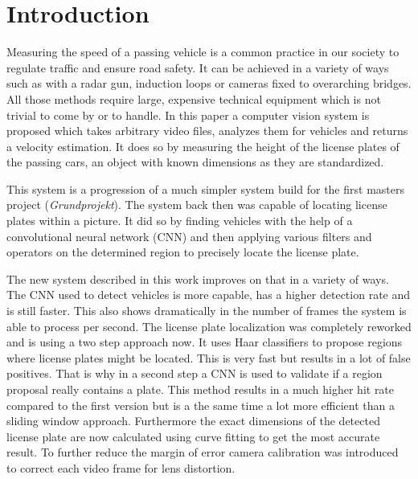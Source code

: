 \chapter{Introduction}\label{ch:introduction}

Measuring the speed of a passing vehicle is a common practice in our society to regulate traffic and ensure road safety.
It can be achieved in a variety of ways such as with a radar gun, induction loops or cameras fixed to overarching bridges.
All those methods require large, expensive technical equipment which is not trivial to come by or to handle.
In this paper a computer vision system is proposed which takes arbitrary video files, analyzes them for vehicles and returns a velocity estimation.
It does so by measuring the height of the license plates of the passing cars, an object with known dimensions as they are standardized.

This system is a progression of a much simpler system build for the first masters project (\textit{Grundprojekt}).
The system back then was capable of locating license plates within a picture.
It did so by finding vehicles with the help of a convolutional neural network (CNN) and then applying various filters and operators on the determined region to precisely locate the license plate.

The new system described in this work improves on that in a variety of ways.
The CNN used to detect vehicles is more capable, has a higher detection rate and is still faster.
This also shows dramatically in the number of frames the system is able to process per second.
The license plate localization was completely reworked and is using a two step approach now.
It uses Haar classifiers to propose regions where license plates might be located.
This is very fast but results in a lot of false positives.
That is why in a second step a CNN is used to validate if a region proposal really contains a plate.
This method results in a much higher hit rate compared to the first version but is a the same time a lot more efficient than a sliding window approach.
Furthermore the exact dimensions of the detected license plate are now calculated using curve fitting to get the most accurate result.
To further reduce the margin of error camera calibration was introduced to correct each video frame for lens distortion.
